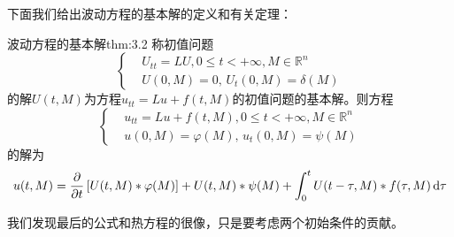 下面我们给出波动方程的基本解的定义和有关定理：
\begin{theorem}{波动方程的基本解}{thm:3.2}
    称初值问题
    \begin{equation*}
        \left\{
            \begin{aligned}
                &U_{tt} = LU, 0 \leq t < +\infty, M \in \mathbb{R}^n\\
                &U(0, M) = 0,\, U_t(0, M) = \delta(M)
            \end{aligned}
        \right.
    \end{equation*}
    的解$U(t, M)$为方程$u_{tt} = Lu + f(t, M)$的初值问题的基本解。则方程
    \begin{equation*}
        \left\{
            \begin{aligned}
                &u_{tt} = Lu + f\left(t, M\right), 0 \leq t < +\infty, M \in \mathbb{R}^n\\
                &u(0, M) = \varphi(M),\, u_t(0, M) = \psi(M)
            \end{aligned}
        \right.
    \end{equation*}
    的解为
    \[u(t, M) = \pdv{}{t}\left[U(t, M) * \varphi(M)\right] + U(t, M) * \psi(M) + \int_{0}^{t} U(t - \tau, M) * f(\tau, M) \dd{\tau}\]
\end{theorem}
我们发现最后的公式和热方程的很像，只是要考虑两个初始条件的贡献。
